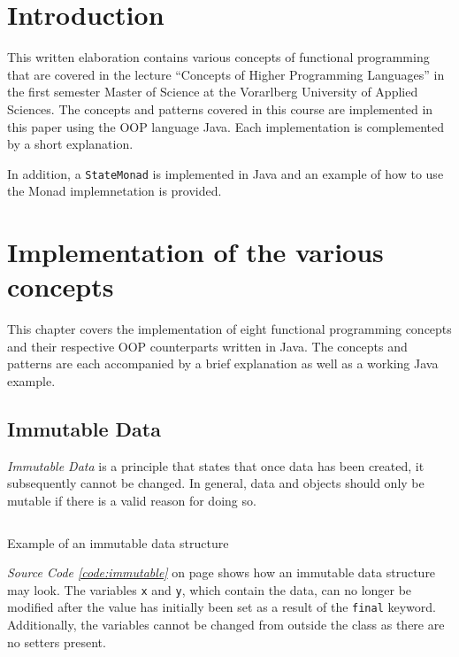 \documentclass[a4paper,12pt,twoside]{scrreprt}
\begin{document}
\clearpage
{}
{}
\listoflistings

\cleardoublepage
{}
\chapter{Introduction}
This written elaboration contains various concepts of functional programming that are covered in the lecture \enquote{Concepts of Higher Programming Languages} in the first semester Master of Science at the Vorarlberg University of Applied Sciences. The concepts and patterns covered in this course are implemented in this paper using the \ac{OOP} language Java. Each implementation is complemented by a short explanation.

In addition, a \texttt{StateMonad} is implemented in Java and an example of how to use the Monad implemnetation is provided.

\chapter{Implementation of the various concepts}
This chapter covers the implementation of eight functional programming concepts and their respective \acs{OOP} counterparts written in Java. The concepts and patterns are each accompanied by a brief explanation as well as a working Java example.

\section{Immutable Data}
\textit{Immutable Data} is a principle that states that once data has been created, it subsequently cannot be changed. In general, data and objects should only be mutable if there is a valid reason for doing so.

\begin{listing}[ht]
    \inputminted[fontsize=\footnotesize,linenos]{java}{./code/ImmutableIntegerPair.java}
    \caption[Example of an immutable data structure]{Example of an immutable data structure}
    \label{code:immutable}
\end{listing}

\textit{Source Code \ref{code:immutable}} on page \pageref{code:immutable} shows how an immutable data structure may look. The variables \texttt{x} and \texttt{y}, which contain the data, can no longer be modified after the value has initially been set as a result of the \texttt{final} keyword. Additionally, the variables cannot be changed from outside the class as there are no setters present.
\end{document}
